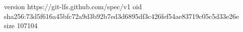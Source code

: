 version https://git-lfs.github.com/spec/v1
oid sha256:73d5f616a45bfc72a9d3b92b7ed3d6895df3c426fef54ae83719c05c5d33e26e
size 107104
